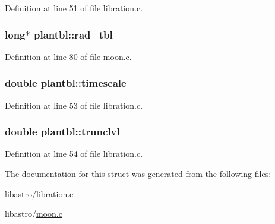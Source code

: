 Definition at line 51 of file libration.\-c.

\hypertarget{structplantbl_ad251398d26d585b019b815cf883bdf21}{
\subsubsection[{rad\-\_\-tbl}]{\setlength{\rightskip}{0pt plus 5cm}long$\ast$ plantbl\-::rad\-\_\-tbl}}\label{structplantbl_ad251398d26d585b019b815cf883bdf21}


Definition at line 80 of file moon.\-c.

\hypertarget{structplantbl_a3e2d024d73e69f7b206e9897e2ef5899}{
\subsubsection[{timescale}]{\setlength{\rightskip}{0pt plus 5cm}double plantbl\-::timescale}}\label{structplantbl_a3e2d024d73e69f7b206e9897e2ef5899}


Definition at line 53 of file libration.\-c.

\hypertarget{structplantbl_a64f2717aa4612ef968d72e639702c543}{
\subsubsection[{trunclvl}]{\setlength{\rightskip}{0pt plus 5cm}double plantbl\-::trunclvl}}\label{structplantbl_a64f2717aa4612ef968d72e639702c543}


Definition at line 54 of file libration.\-c.



The documentation for this struct was generated from the following files\-:\begin{DoxyCompactItemize}
\item 
libastro/\hyperlink{libration_8c}{libration.\-c}\item 
libastro/\hyperlink{moon_8c}{moon.\-c}\end{DoxyCompactItemize}
